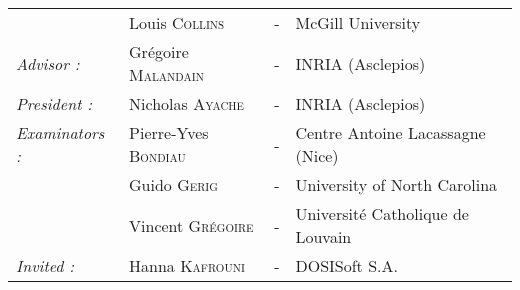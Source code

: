\begin{titlepage}
\begin{center}
\begin{tabular}{llcl}
				& Louis \textsc{Collins}		& - & McGill University\\
      \textit{Advisor :}	& Grégoire \textsc{Malandain}		& - & INRIA (Asclepios)\\
      \textit{President :}	& Nicholas \textsc{Ayache}		& - & INRIA (Asclepios)\\
      \textit{Examinators :}   & Pierre-Yves \textsc{Bondiau}          & - & Centre Antoine Lacassagne (Nice)\\
      				& Guido \textsc{Gerig}			& - & University of North Carolina\\
      				& Vincent \textsc{Grégoire}		& - & Université Catholique de Louvain\\
      \textit{Invited :}		& Hanna \textsc{Kafrouni}		& - & DOSISoft S.A.
\end{tabular}
\end{center}
\end{titlepage}

\sloppy

\titlepage
